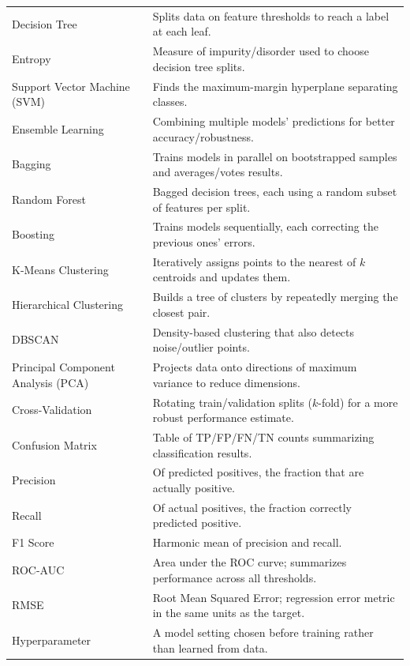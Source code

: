 \documentclass[11pt,a4paper]{article}
\begin{document}
\begin{longtable}{@{}p{3.3cm}p{10.2cm}@{}}
\addlinespace
Decision Tree & Splits data on feature thresholds to reach a label at each leaf. \\
\addlinespace
Entropy & Measure of impurity/disorder used to choose decision tree splits. \\
\addlinespace
Support Vector Machine (SVM) & Finds the maximum-margin hyperplane separating classes. \\
\addlinespace
Ensemble Learning & Combining multiple models' predictions for better accuracy/robustness. \\
\addlinespace
Bagging & Trains models in parallel on bootstrapped samples and averages/votes results. \\
\addlinespace
Random Forest & Bagged decision trees, each using a random subset of features per split. \\
\addlinespace
Boosting & Trains models sequentially, each correcting the previous ones' errors. \\
\addlinespace
K-Means Clustering & Iteratively assigns points to the nearest of $k$ centroids and updates them. \\
\addlinespace
Hierarchical Clustering & Builds a tree of clusters by repeatedly merging the closest pair. \\
\addlinespace
DBSCAN & Density-based clustering that also detects noise/outlier points. \\
\addlinespace
Principal Component Analysis (PCA) & Projects data onto directions of maximum variance to reduce dimensions. \\
\addlinespace
Cross-Validation & Rotating train/validation splits ($k$-fold) for a more robust performance estimate. \\
\addlinespace
Confusion Matrix & Table of TP/FP/FN/TN counts summarizing classification results. \\
\addlinespace
Precision & Of predicted positives, the fraction that are actually positive. \\
\addlinespace
Recall & Of actual positives, the fraction correctly predicted positive. \\
\addlinespace
F1 Score & Harmonic mean of precision and recall. \\
\addlinespace
ROC-AUC & Area under the ROC curve; summarizes performance across all thresholds. \\
\addlinespace
RMSE & Root Mean Squared Error; regression error metric in the same units as the target. \\
\addlinespace
Hyperparameter & A model setting chosen before training rather than learned from data. \\

\end{longtable}
\end{document}
